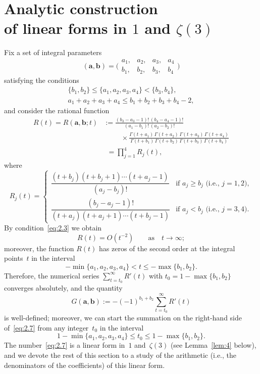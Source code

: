 \documentclass[a4paper,twoside]{article}
\numberwithin{equation}{section}
\renewcommand{\[}{\lfloor}
\renewcommand{\]}{\rfloor}
\newcommand{\<}{\langle}
\renewcommand{\>}{\rangle}
\newcommand{\ba}{\boldsymbol a}
\newcommand{\bb}{\boldsymbol b}
\begin{document}
\section{Analytic construction\\ of linear forms in $1$ and $\zeta(3)$}
\label{sec:2}
Fix a set of integral parameters
\begin{equation}
(\ba,\bb)
=\biggl(\begin{array}{rrrr}
a_1, & a_2, & a_3, & a_4 \\
b_1, & b_2, & b_3, & b_4
\end{array}\biggr)
\label{eq:2.1}
\end{equation}
satisfying the conditions
\begin{gather}
\{b_1,b_2\}\le\{a_1,a_2,a_3,a_4\}<\{b_3,b_4\},
\label{eq:2.2}
\\
a_1+a_2+a_3+a_4\le b_1+b_2+b_3+b_4-2,
\label{eq:2.3}
\end{gather}
and consider the rational function
\begin{equation}
\begin{split}
R(t)
=R(\ba,\bb;t)
&:=\frac{(b_3-a_3-1)!\,(b_4-a_4-1)!}{(a_1-b_1)!\,(a_2-b_2)!}
\\ &\phantom:\qquad\times
\frac{\Gamma(t+a_1)\,\Gamma(t+a_2)\,\Gamma(t+a_3)\,\Gamma(t+a_4)}
{\Gamma(t+b_1)\,\Gamma(t+b_2)\,\Gamma(t+b_3)\,\Gamma(t+b_4)}
\\ &\phantom:
=\prod_{j=1}^4R_j(t),
\end{split}
\label{eq:2.4}
\end{equation}
where
\begin{equation}
R_j(t)=\begin{cases}
\dfrac{(t+b_j)(t+b_j+1)\dotsb(t+a_j-1)}{(a_j-b_j)!}
& \mbox{if $a_j\ge b_j$ (i.e., $j=1,2$)}, \\
\dfrac{(b_j-a_j-1)!}{(t+a_j)(t+a_j+1)\dotsb(t+b_j-1)}
& \mbox{if $a_j<b_j$ (i.e., $j=3,4$)}.
\end{cases}
\label{eq:2.5}
\end{equation}
By condition~\eqref{eq:2.3} we obtain
\begin{equation}
R(t)=O(t^{-2})
\qquad\mbox{as}\quad t\to\infty;
\label{eq:2.6}
\end{equation}
moreover, the function $R(t)$ has zeros of the second order
at the integral points~$t$ in the interval
$$
-\min\{a_1,a_2,a_3,a_4\}<t\le-\max\{b_1,b_2\}.
$$
Therefore, the numerical series $\sum_{t=t_0}^\infty R'(t)$
with $t_0=1-\max\{b_1,b_2\}$ converges absolutely,
and the quantity
\begin{equation}
G(\ba,\bb)
:=-(-1)^{b_1+b_2}\sum_{t=t_0}^\infty R'(t)
\label{eq:2.7}
\end{equation}
is well-defined; moreover, we can start the summation
on the right-hand side of~\eqref{eq:2.7} from any integer~$t_0$
in the interval
\begin{equation}
1-\min\{a_1,a_2,a_3,a_4\}\le t_0\le 1-\max\{b_1,b_2\}.
\label{eq:2.8}
\end{equation}
The number~\eqref{eq:2.7} is a linear form in~$1$ and~$\zeta(3)$
(see Lemma~\ref{lem:4} below), and we devote the rest of this section
to a study of the arithmetic (i.e., the denominators of the coefficients)
of this linear form.
\end{document}
